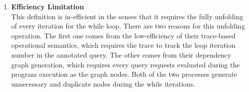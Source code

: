 {\begin{enumerate}
    This dependency graph definition relies on a specific memory, while map, and a specific execution trace.
    It limits the adaptivity defined for the adaptive data analysis program has to be w.r.t. one specific
    execution.
    In the other words, this adaptivity definition doesn't correspond to the \emph{adaptivity} for this program,
    but for the program in a certain execution.
    \item \textbf{Efficiency Limitation}
    \\
    This definition is in-efficient in the senses that it requires the fully unfolding of every iteration for the while loop.
    There are two reasons for this unfolding operation.
    The first one comes from the low-efficiency of their trace-based operational semantics,
    which requires the trace to track the loop iteration number in the annotated query.
    The other comes from their dependency graph generation, which requires every query requests evaluated during the program execution
    as the graph nodes.
    Both of the two processes generate unnecessary and duplicate nodes during the while iterations.
\end{enumerate}
}